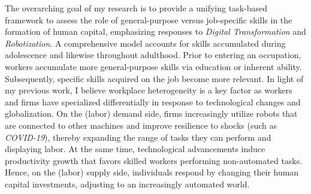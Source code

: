 \documentclass[a4paper,11pt]{article}
\begin{document}

The overarching goal of my research is to provide a unifying task-based framework to assess the role of general-purpose versus job-specific skills in the formation of human capital, emphasizing responses to \textit{Digital Transformation} and \textit{Robotization}. A comprehensive model accounts for skills accumulated during adolescence and likewise throughout adulthood. Prior to entering an occupation, workers accumulate more general-purpose skills via education or inherent ability. Subsequently, specific skills acquired on the job become more relevant. In light of my previous work, I believe workplace heterogeneity is a key factor as workers and firms have specialized differentially in response to technological changes and globalization. On the (labor) demand side, firms increasingly utilize robots that are connected to other machines and improve resilience to shocks (such as \textit{COVID-19}), thereby expanding the range of tasks they can perform and displaying labor. At the same time, technological advancements induce productivity growth that favors skilled workers performing non-automated tasks. Hence, on the (labor) supply side, individuals respond by changing their human capital investments, adjusting to an increasingly automated world. 
\end{document}
